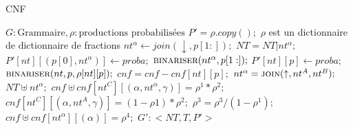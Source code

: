 \documentclass{article}
\begin{document}
\begin{algorithm}
\caption{CNF}
\label{cnf}
	\begin{algorithmic}
		 \Comment $G: \text{Grammaire}, \rho: \text{productions probabilisées}$
			\State $P' = \rho.copy();$ \Comment $\rho$ est un dictionnaire de dictionnaire de fractions
					\State $ nt^\alpha \gets join(\downarrow, p[1:]);$
					\State $NT = NT | nt^\alpha;$
					\State $ P'[nt][(p[0],nt^\alpha)] \gets proba;$
					\State $ \Call{binariser}{nt^\alpha, p[1:]};$
				\Else
					\State $P'[nt][p] \gets proba;$
				\EndIf
			\EndFunction
					\State $ \Call{binariser}{nt, p, \rho[nt][p]} ;$
					\State $cnf = cnf - cnf[nt][p];$
				\EndIf
			\EndFor
		\EndFor
			\State $nt^\alpha = \Call{join}{\uparrow, nt^A, nt^B};$
			\State $NT \uplus nt^\alpha;$
				\State $ cnf \uplus cnf[nt^C][(\alpha, nt^\alpha, \gamma)] = \rho^1 * \rho^2;$
				\State $cnf[nt^C][(\alpha, nt^A,\gamma)] = (1 - \rho1) * \rho^2;$
			\EndFor
				\State $\rho^3 = \rho^3 / (1 - \rho^1);$
			\EndFor
				\State $cnf \uplus cnf[nt^\alpha][(\alpha)] = \rho^4;$
			\EndFor
		\EndFor
		\State \Return $G': < NT, T, P'  >$
		\EndFunction
	\end{algorithmic}
\end{algorithm}
\end{document}
